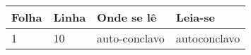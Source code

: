 %
%
%
%

 \begin{table}[htb]
	\centering
	\footnotesize
	\begin{tabular}{|p{1.4cm}|p{1cm}|p{3cm}|p{3cm}|}
		\hline
		\textbf{Folha} & \textbf{Linha}  & \textbf{Onde se lê}  & \textbf{Leia-se}  \\
		\hline
		1 & 10 & auto-conclavo & autoconclavo\\
		\hline
	\end{tabular}
\end{table}